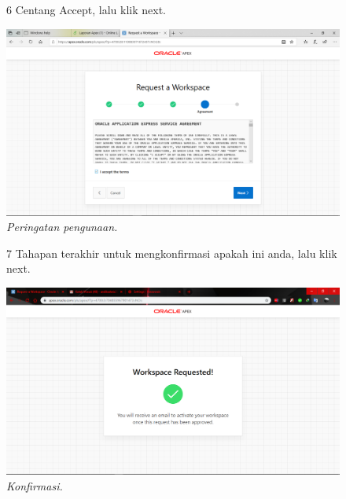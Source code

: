 \begin{enumerate}
\begin{figure}
\label{gambar}
\end{figure}

\begin{figure}
\item[6] Centang Accept, lalu klik next.

    \begin{center}
\includegraphics[scale=0.2]{figures/004.png}
    \caption{\textit{Peringatan pengunaan.}}
        \end{center}

\label{gambar}
\end{figure}

\begin{figure}
\item[7] Tahapan terakhir untuk mengkonfirmasi apakah ini anda, lalu klik next.

    \begin{center}
\includegraphics[scale=0.2]{figures/005.png}
    \caption{\textit{Konfirmasi.}}
        \end{center}
\label{gambar}
\end{figure}


\end{enumerate}
